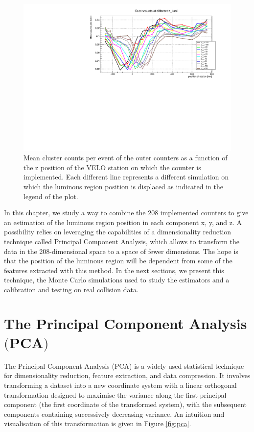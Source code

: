 \begin{figure}
    \centering
    \includegraphics[width=\textwidth]{figures/z_lumi_dependency.pdf}
    \caption{Mean cluster counts per event of the outer counters as a function of the z position of the VELO station on which the counter is implemented. Each different line represents a different simulation on which the luminous region position is displaced as indicated in the legend of the plot.}
    \label{fig:z_lumi_dependency}
\end{figure}

In this chapter, we study a way to combine the 208 implemented counters to give an estimation of the luminous region position in each component x, y, and z. A possibility relies on leveraging the capabilities of a dimensionality reduction technique called Principal Component Analysis, which allows to transform the data in the 208-dimensional space to a space of fewer dimensions. The hope is that the position of the luminous region will be dependent from some of the features extracted with this method. In the next sections, we present this technique, the Monte Carlo simulations used to study the estimators and a calibration and testing on real collision data.



\section[The Principal Component Analysis]{The Principal Component Analysis $\bigl($PCA$\bigr)$}\label{sec:PCA}

The Principal Component Analysis (PCA) is a widely used statistical technique for dimensionality reduction, feature extraction, and data compression. It involves transforming a dataset into a new coordinate system with a linear orthogonal transformation designed to maximise the variance along the first principal component (the first coordinate of the transformed system), with the subsequent components containing successively decreasing variance.
An intuition and visualisation of this transformation is given in Figure \ref{fig:pca}.

